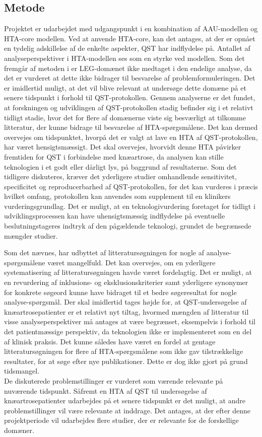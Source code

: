 \subsection{Metode} \label{Metode_diskussion} %
Projektet er udarbejdet med udgangspunkt i en kombination af AAU-modellen og HTA-core modellen. Ved at anvende HTA-core, kan det antages, at der er opnået en tydelig adskillelse af de enkelte aspekter, QST har indflydelse på.
Antallet af analyseperspektiver i HTA-modellen ses som en styrke ved modellen. Som det fremgår af metoden i  er LEG-domænet ikke medtaget i den endelige analyse, da det er vurderet at dette ikke bidrager til besvarelse af problemformuleringen. Det er imidlertid muligt, at det vil blive relevant at undersøge dette domæne på et senere tidspunkt i forhold til QST-protokollen. Gennem analyserne er det fundet, at forskningen og udviklingen af QST-protokollen stadig befinder sig i et relativt tidligt stadie, hvor det for flere af domænerne viste sig besværligt at tilkomme litteratur, der kunne bidrage til besvarelse af HTA-spørgsmålene. Det kan dermed overvejes om tidspunktet, hvorpå det er valgt at lave en HTA af QST-protokollen, har været hensigtsmæssigt. Det skal overvejes, hvorvidt denne HTA påvirker fremtiden for QST i forbindelse med knæartrose, da analysen kan stille teknologien i et godt eller dårligt lys, på baggrund af resultaterne. Som det tidligere diskuteres, kræver det yderligere studier omhandlende sensitivitet, specificitet og reproducerbarhed af QST-protokollen, før det kan vurderes i præcis hvilket omfang, protokollen kan anvendes som supplement til en klinikers vurderingsgrundlag. Det er muligt, at en teknologivurdering foretaget for tidligt i udviklingsprocessen kan have uhensigtsmæssig indflydelse på eventuelle beslutningstageres indtryk af den pågældende teknologi, grundet de begrænsede mængder studier.

Som det nævnes, har udbyttet af litteratursøgningen for nogle af analyse-spørgsmålene været mangelfuld. Det kan overvejes, om en yderligere systematisering af litteratursøgningen havde været fordelagtig. Det er muligt, at en revurdering af inklusions- og eksklusionskriterier samt yderligere synonymer for konkrete søgeord kunne have bidraget til et bedre søgeresultat for nogle analyse-spørgsmål. Der skal imidlertid tages højde for, at QST-undersøgelse af knæartrosepatienter er et relativt nyt tiltag, hvormed mængden af litteratur til visse analyseperspektiver må antages at være begrænset, eksempelvis i forhold til det patientmæssige perspektiv, da teknologien ikke er implementeret som en del af klinisk praksis. Det kunne således have været en fordel at gentage litteratursøgningen for flere af HTA-spørgsmålene som ikke gav tilstrækkelige resultater, for at søge efter nye publikationer. Dette er dog ikke gjort på grund tidsmangel.\\
De diskuterede problemstillinger er vurderet som værende relevante på nuværende tidspunkt. Såfremt en HTA af QST til undersøgelse af knæartrosepatienter udarbejdes på et senere tidspunkt er det muligt, at andre problemstillinger vil være relevante at inddrage. Det antages, at der efter denne projektperiode vil udarbejdes flere studier, der er relevante for de forskellige domæner.
